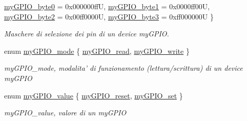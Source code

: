 \begin{DoxyCompactItemize}
\hyperlink{group__my_g_p_i_o_gga402a0d20afc0cb7c25554b8b023f4253a0347b1742eef6b2575a7d409c7fb5c3d}{my\+G\+P\+I\+O\+\_\+byte0} = 0x000000ff\+U, 
\hyperlink{group__my_g_p_i_o_gga402a0d20afc0cb7c25554b8b023f4253ae5aec65fa20f554b893e419fc2755fd0}{my\+G\+P\+I\+O\+\_\+byte1} = 0x0000ff00\+U, 
\hyperlink{group__my_g_p_i_o_gga402a0d20afc0cb7c25554b8b023f4253af4892f7db28c64a7cf2a7236c88b742b}{my\+G\+P\+I\+O\+\_\+byte2} = 0x00ff0000\+U, 
\hyperlink{group__my_g_p_i_o_gga402a0d20afc0cb7c25554b8b023f4253a1ceefb9d65397352e986c573984d0129}{my\+G\+P\+I\+O\+\_\+byte3} = 0xff000000\+U
 \}
\begin{DoxyCompactList}\small\item\em Maschere di selezione dei pin di un device my\+G\+P\+I\+O. \end{DoxyCompactList}\item 
enum \hyperlink{group__my_g_p_i_o_ga76b849f0e0c05e7f9161bdb33396f2b1}{my\+G\+P\+I\+O\+\_\+mode} \{ \hyperlink{group__my_g_p_i_o_gga76b849f0e0c05e7f9161bdb33396f2b1a1e6dc78e7641e878cadc842d39605d5d}{my\+G\+P\+I\+O\+\_\+read}, 
\hyperlink{group__my_g_p_i_o_gga76b849f0e0c05e7f9161bdb33396f2b1a2d66976280eb7595a42c631683bdfad6}{my\+G\+P\+I\+O\+\_\+write}
 \}
\begin{DoxyCompactList}\small\item\em my\+G\+P\+I\+O\+\_\+mode, modalita' di funzionamento (lettura/scrittura) di un device my\+G\+P\+I\+O \end{DoxyCompactList}\item 
enum \hyperlink{group__my_g_p_i_o_gaf634fe4a0e1eab8da5000b72d6ad362b}{my\+G\+P\+I\+O\+\_\+value} \{ \hyperlink{group__my_g_p_i_o_ggaf634fe4a0e1eab8da5000b72d6ad362ba98cde80dbda025bd1ae7231c76b55674}{my\+G\+P\+I\+O\+\_\+reset}, 
\hyperlink{group__my_g_p_i_o_ggaf634fe4a0e1eab8da5000b72d6ad362ba10d296f3711d01189cc6c2d87f7c9149}{my\+G\+P\+I\+O\+\_\+set}
 \}
\begin{DoxyCompactList}\small\item\em my\+G\+P\+I\+O\+\_\+value, valore di un my\+G\+P\+I\+O \end{DoxyCompactList}\end{DoxyCompactItemize}
